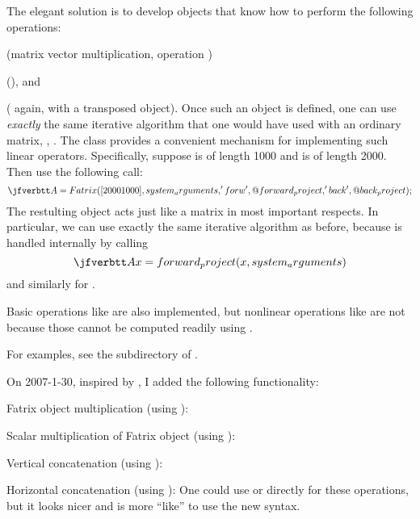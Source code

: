 The elegant solution
is to develop \matlab objects
that know how to perform
the following operations:
\blist
\item
{}
(matrix vector multiplication,
operation )
\item
{}
(), and
\item
{}
( again,
with a transposed object).
\elist
Once such an object is
defined,
one can use \emph{exactly}
the same iterative algorithm
that one would have used
with an ordinary matrix,
\eg,
.
%
The \fatrix class
provides a convenient mechanism
for implementing
such linear operators.
%
Specifically,
suppose \x is of length 1000
and \y is of length 2000.
Then use the following call:
\[
\ty{
A = Fatrix([2000 1000], system_arguments,
 'forw', @forward_project, 'back', @back_project);
}
\]
The restulting \fatrix object 
acts just like a matrix
in most important respects.
In particular,
we can use exactly the same iterative algorithm
 as before,
because
is handled internally
by calling
\[
\ty{
Ax = forward_project(x, system_arguments)
}
\]
and similarly for
.

Basic operations
like 
are also implemented,
but nonlinear operations
like 
are not
because those cannot be computed readily
using . 

For examples, see
the  subdirectory of \irt.

On 2007-1-30,
inspired by ,
I added the following functionality:
\blist
\item
Fatrix object multiplication
(using ): 
\item
Scalar multiplication of Fatrix object
(using ): 
\item
Vertical concatenation (using ):
\item
Horizontal concatenation (using ):
\elist
One could use  or 
directly for these operations,
but it looks nicer
and is more ``\matlab like''
to use the new syntax.
